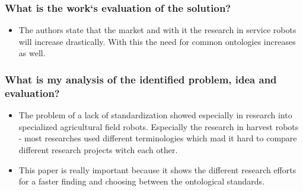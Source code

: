     \subsubsection*{What is the work`s evaluation of the solution?}
    \begin{itemize}
        \item The authors state that the market and with it the research in service robots will increase drastically. With this the need for common ontologies increases as well. 
    \end{itemize}
    \subsubsection*{What is my analysis of the identified problem, idea and evaluation?}
    \begin{itemize}
        \item The problem of a lack of standardization showed especially in research into specialized agricultural field robots. Especially the research in harvest robots - most researches used different terminologies which mad it hard to compare different research projects witch each other.
        \item This paper is really important because it shows the different research efforts for a faster finding and choosing between the ontological standards.
    \end{itemize}
